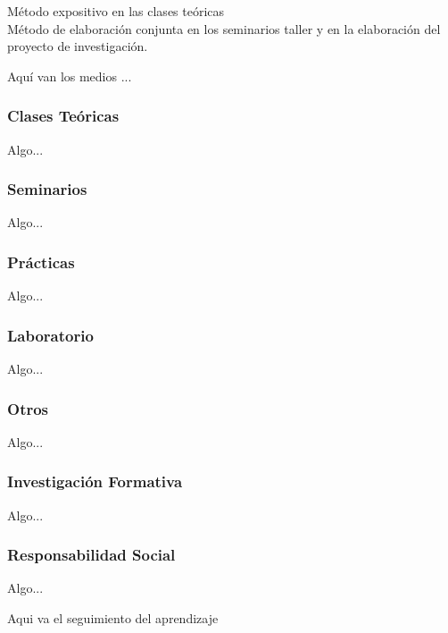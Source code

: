\documentclass[a4paper,8pt]{article}
\begin{document}
\begin{estrategiasEnsenanza}
    \begin{metodos}
        Método expositivo en las clases teóricas \\
        Método de elaboración conjunta en los seminarios taller y en la elaboración del proyecto de investigación.
    \end{metodos}
    \begin{medios}
        Aquí van los medios ...
    \end{medios}
    \begin{formasOrganizacion}
        \subsubsection{Clases Teóricas}
        Algo...
        \subsubsection{Seminarios}
        Algo...
        \subsubsection{Prácticas}
        Algo...
        \subsubsection{Laboratorio}
        Algo...
        \subsubsection{Otros}
        Algo...
    \end{formasOrganizacion}
    \begin{programacion}
        \subsubsection{Investigación Formativa}
        Algo...
        \subsubsection{Responsabilidad Social}
        Algo...
    \end{programacion}
    \begin{segumientoAprendizaje}
        Aqui va el seguimiento del aprendizaje
    \end{segumientoAprendizaje}
\end{estrategiasEnsenanza}
\end{document}
